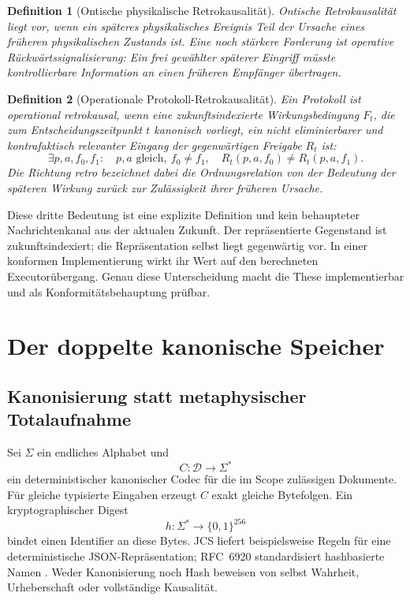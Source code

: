 \documentclass[11pt,a4paper]{article}
\newtheorem{definition}{Definition}[section]
\theoremstyle{remark}
\begin{document}
\begin{definition}[Ontische physikalische Retrokausalität]
Ontische Retrokausalität liegt vor, wenn ein späteres physikalisches Ereignis
Teil der Ursache eines früheren physikalischen Zustands ist. Eine noch
stärkere Forderung ist operative Rückwärtssignalisierung: Ein frei gewählter
späterer Eingriff müsste kontrollierbare Information an einen früheren
Empfänger übertragen.
\end{definition}

\begin{definition}[Operationale Protokoll-Retrokausalität]
\label{def:operational-retrocausality}
Ein Protokoll ist operational retrokausal, wenn eine zukunftsindexierte
Wirkungsbedingung \(F_t\), die zum Entscheidungszeitpunkt \(t\) kanonisch
vorliegt, ein nicht eliminierbarer und kontrafaktisch relevanter Eingang der
gegenwärtigen Freigabe \(R_t\) ist:
\[
  \exists p,a,f_0,f_1:\quad
  p,a\text{ gleich},\ f_0\neq f_1,\quad
  R_t(p,a,f_0)\neq R_t(p,a,f_1).
\]
Die Richtung \emph{retro} bezeichnet dabei die Ordnungsrelation von der
Bedeutung der späteren Wirkung zurück zur Zulässigkeit ihrer früheren Ursache.
\end{definition}

Diese dritte Bedeutung ist eine explizite Definition und kein behaupteter
Nachrichtenkanal aus der aktualen Zukunft. Der repräsentierte Gegenstand ist
zukunftsindexiert; die Repräsentation selbst liegt gegenwärtig vor. In einer
konformen Implementierung wirkt ihr Wert auf den berechneten
Executorübergang. Genau diese Unterscheidung macht die These implementierbar
und als Konformitätsbehauptung prüfbar.

\section{Der doppelte kanonische Speicher}

\subsection{Kanonisierung statt metaphysischer Totalaufnahme}

Sei \(\Sigma\) ein endliches Alphabet und
\[
  C : \mathcal{D}\longrightarrow\Sigma^{*}
\]
ein deterministischer kanonischer Codec für die im Scope zulässigen
Dokumente. Für gleiche typisierte Eingaben erzeugt \(C\) exakt gleiche
Bytefolgen. Ein kryptographischer Digest
\[
  h:\Sigma^{*}\longrightarrow\{0,1\}^{256}
\]
bindet einen Identifier an diese Bytes. JCS liefert beispielsweise Regeln
für eine deterministische JSON-Repräsentation; RFC~6920 standardisiert
hashbasierte Namen \cite{rfc8785,rfc6920}. Weder Kanonisierung noch Hash
beweisen von selbst Wahrheit, Urheberschaft oder vollständige Kausalität.
\end{document}
